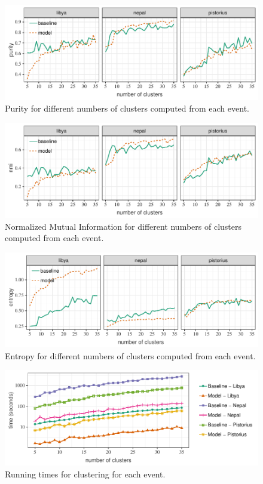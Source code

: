 \begin{figure}
  \centering
  \includegraphics[width=\textwidth]{figures/url-model/purity}
  \caption{Purity for different numbers of clusters computed from each event.}\label{fig:purity}
\end{figure}%

\begin{figure}
    \centering
    \includegraphics[width=\textwidth]{figures/url-model/nmi} 
    \caption{Normalized Mutual Information for different numbers of clusters computed from each event.}\label{fig:nmi}
\end{figure}

\begin{figure}
  \centering
  \includegraphics[width=\textwidth]{figures/url-model/entropy} 
  \caption{Entropy for different numbers of clusters computed from each event.}\label{fig:entropy}
\end{figure}


\begin{figure}
  \centering
  \includegraphics[width=\textwidth]{figures/url-model/times}
  \caption{Running times for clustering for each event.}\label{fig:times}
\end{figure}%